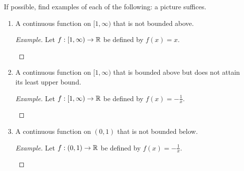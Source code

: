 \documentclass[../main.tex]{subfiles}
\begin{document}
\begin{exercise}\label{exr:10.2}
    If possible, find examples of each of the following: a picture suffices.
    \begin{enumerate}[label={\alph*)}]
        \item A continuous function on $[1,\infty)$ that is not bounded above.
        \begin{proof}[Example]
            Let $f:[1,\infty)\to\mathbb{R}$ be defined by $f(x)=x$.
            \begin{center}
            \end{center}
        \end{proof}
        \item A continuous function on $[1,\infty)$ that is bounded above but does not attain its least upper bound.
        \begin{proof}[Example]
            Let $f:[1,\infty)\to\mathbb{R}$ be defined by $f(x)=-\frac{1}{x}$.
            \begin{center}
            \end{center}
        \end{proof}
        \item A continuous function on $(0,1)$ that is not bounded below.
        \begin{proof}[Example]
            Let $f:(0,1)\to\mathbb{R}$ be defined by $f(x)=-\frac{1}{x}$.
            \begin{center}
\end{center}
\end{proof}
\end{enumerate}
\end{exercise}
\end{document}
